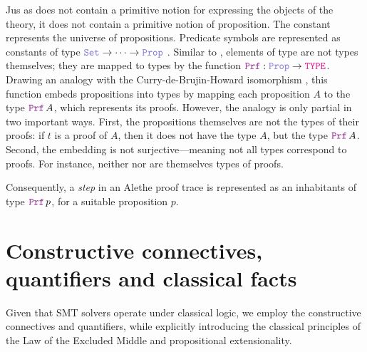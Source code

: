 Jus as \lpm{} does not contain a primitive notion for expressing the objects of the theory, it does not contain a primitive notion of proposition.
The constant \prop{} represents the universe of propositions. Predicate symbols are represented as constants of type $\set{} \ra \dots \ra \prop$ .
Similar to \set{}, elements of type \prop{} are not types themselves; they are mapped to types by the function $\prf{}: \prop \rightarrow \type$.
Drawing an analogy with the Curry-de-Brujin-Howard isomorphism \cite{curryhoward}, this function embeds propositions into types by mapping each proposition $A$ to the type $\prf\,A$, which represents its proofs.
However, the analogy is only partial in two important ways. First, the propositions themselves are not the types of their proofs: if $t$ is a proof of $A$, then it does not have the type $A$,
but the type $\prf\,A$. Second, the embedding is not surjective—meaning not all types correspond to proofs. For instance, neither \set{} nor \prop{} are themselves types of proofs. 

Consequently, a \emph{step} in an Alethe proof trace is represented as an inhabitants of type $\prf{}\,p$, for a suitable proposition $p$.

\section{Constructive connectives, quantifiers and classical facts}
\label{ssec:encoding-prop}

Given that SMT solvers operate under classical logic, we employ the constructive connectives and quantifiers,
while explicitly introducing the classical principles of the Law of the Excluded Middle and propositional extensionality.

